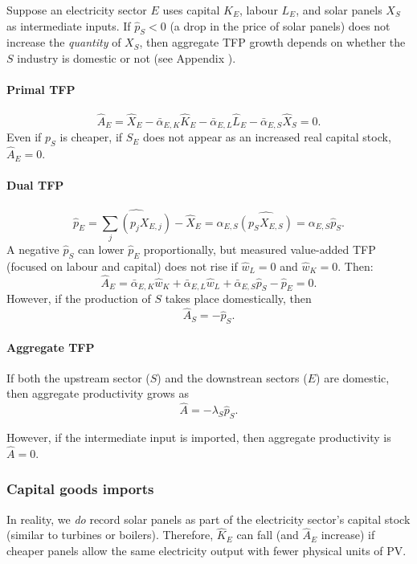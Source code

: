 \documentclass[11pt]{article}
\begin{document}
Suppose an electricity sector $E$ uses capital $K_E$, labour $L_E$, and solar panels $X_S$ as intermediate inputs. If $\hat{p}_S<0$ (a drop in the price of solar panels) does not increase the \emph{quantity} of $X_S$, then aggregate TFP growth depends on whether the $S$ industry is domestic or not (see Appendix ).

\paragraph{Primal TFP}
\[
\hat{A}_E=\hat{X}_E-\bar{\alpha}_{E,K}\hat{K}_E-\bar{\alpha}_{E,L}\hat{L}_E-\bar{\alpha}_{E,S}\hat{X}_S=0.
\]
Even if $p_S$ is cheaper, if $S_E$ does not appear as an increased real capital stock, $\hat{A}_E=0.$

\paragraph{Dual TFP}
\[
\hat{p}_E=\widehat{\sum_j(p_jX_{E,j})}-\hat{X}_E=\alpha_{E,S} \widehat{(p_SX_{E,S})}=\alpha_{E,S} \hat{p}_S.
\]
A negative $\hat{p}_S$ can lower $\hat{p}_E$ proportionally, but measured value-added TFP (focused on labour and capital) does not rise if $\hat{w}_L=0$ and $\hat{w}_K=0$. Then:
\[
\hat{A}_E=\bar{\alpha}_{E,K}\hat{w}_K+\bar{\alpha}_{E,L}\hat{w}_L+\bar{\alpha}_{E,S}\hat{p}_S-\hat{p}_E=0.
\]
However, if the production of $S$ takes place domestically, then 
\begin{equation*}
    \hat{A}_S=-\hat{p}_S.
\end{equation*}

\paragraph{Aggregate TFP}

If both the upstream sector ($S$) and the downstrean sectors ($E$) are domestic, then aggregate productivity grows as
\begin{equation*}
    \hat{A}=-\lambda_S\hat{p}_S.
\end{equation*}

However, if the intermediate input is imported, then aggregate productivity is $\hat{A}=0$.


\subsubsection{Capital goods imports} 
\label{app_section_import_capital}

In reality, we \emph{do} record solar panels as part of the electricity sector's capital stock (similar to turbines or boilers). Therefore, $\hat{K}_E$ can fall (and $\hat{A}_E$ increase) if cheaper panels allow the same electricity output with fewer physical units of PV.
\end{document}
